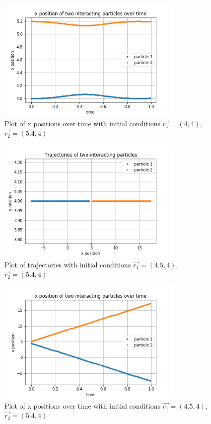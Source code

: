 \documentclass{article}
\begin{document}
\begin{figure}[H]
	\centering
	\includegraphics[width=0.8\textwidth]{../images/q2_i_xpos.png}
	\caption{Plot of x positions over time with initial conditions $\vec{r_1}=(4,4)$, $\vec{r_2}=(5.4,4)$}
	\label{fig:q2_i_xpos}
\end{figure}

\begin{figure}[H]
	\centering
	\includegraphics[width=0.8\textwidth]{../images/q2_ii_traj.png}
	\caption{Plot of trajectories with initial conditions $\vec{r_1}=(4.5,4)$, $\vec{r_2}=(5.4,4)$}
	\label{fig:q2_ii_traj}
\end{figure}

\begin{figure}[H]
	\centering
	\includegraphics[width=0.8\textwidth]{../images/q2_ii_xpos.png}
	\caption{Plot of x positions over time with initial conditions $\vec{r_1}=(4.5,4)$, $\vec{r_2}=(5.4,4)$}
	\label{fig:q2_ii_xpos}
\end{figure}
\end{document}
